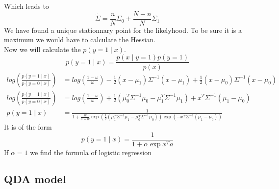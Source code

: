 \documentclass[]{article}
\begin{document}
Which leads to 
$$ \tilde{\Sigma} = \frac{n}{N}\Sigma_0 + \frac{N-n}{N}\Sigma_1 $$
We have found a unique stationnary point for the likelyhood. To be sure it is a maximum we would have to calculate the Hessian.\\
Now we will calculate the $p(y=1 \mid x)$.
$$p(y=1 \mid x) = \frac{p(x \mid y=1)p(y=1)}{p(x)}$$
\begin{align*}
log(\frac{p(y=1 \mid x)}{p(y=0 \mid x)}) &= log(\frac{1-\omega}{\omega}) - \frac{1}{2}(x - \mu_1)\Sigma^{-1}(x - \mu_1) + \frac{1}{2}(x - \mu_0)\Sigma^{-1}(x - \mu_0) \\
log(\frac{p(y=1 \mid x)}{p(y=0 \mid x)}) &= log(\frac{1-\omega}{\omega}) + \frac{1}{2}(\mu_0^T\Sigma^{-1}\mu_0 - \mu_1^T\Sigma^{-1}\mu_1) + x^T\Sigma^{-1}(\mu_1-\mu_0) \\
p(y=1 \mid x) &= \frac{1}{1+\frac{w}{1-w}\exp{(\frac{1}{2}(\mu_1^T\Sigma^{-1}\mu_1 - \mu_0^T\Sigma^{-1}\mu_0 ))}\exp{(-x^T\Sigma^{-1}(\mu_1-\mu_0))}}
\end{align*}
It is of the form
$$ p(y=1 \mid x) = \frac{1}{1+\alpha\exp{x^Ta}} $$
If $\alpha = 1$ we find the formula of logistic regression

\subsection{QDA model}
\end{document}
